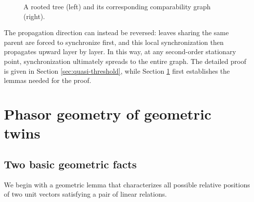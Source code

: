 \documentclass[11pt,reqno]{amsart}
\theoremstyle{definition}
\begin{document}
\begin{figure}[htbp]
\caption{A rooted tree (left) and its corresponding comparability graph (right).}
\label{fig:rooted-tree-comparability}
\end{figure}

The propagation direction can instead be reversed: leaves sharing the same parent are forced to synchronize first, and this local synchronization then propagates upward layer by layer. 
In this way, at any second-order stationary point, synchronization ultimately spreads to the entire graph.
The detailed proof is given in Section \ref{sec:quasi-threshold}, while Section \ref{sec:geo-twins} first establishes the lemmas needed for the proof.
\section{Phasor geometry of geometric twins}\label{sec:geo-twins}
\subsection{Two basic geometric facts}
We begin with a geometric lemma that characterizes all
possible relative positions of two unit vectors satisfying a pair of linear relations.
\end{document}
